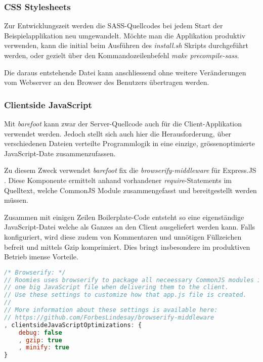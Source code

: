 \subsubsection*{CSS Stylesheets}
Zur Entwicklungszeit werden die SASS-Quellcodes bei jedem Start der Beispielapplikation neu umgewandelt. Möchte man die Applikation produktiv verwenden, kann die initial beim Ausführen des \emph{install.sh} Skripts durchgeführt werden, oder gezielt über den Kommandozeilenbefehl \emph{make precompile-sass}.

Die daraus entstehende Datei kann anschliessend ohne weitere Veränderungen vom Webserver an den Browser des Benutzers übertragen werden.

\subsubsection*{Clientside JavaScript}
Mit \emph{barefoot} \cite{Barefoot} kann zwar der Server-Quellcode auch für die Client-Applikation verwendet werden. Jedoch stellt sich auch hier die Herausforderung, über verschiedenen Dateien verteilte Programmlogik in eine einzige, grössenoptimierte JavaScript-Date zusammenzufassen.

Zu diesem Zweck verwendet \emph{barefoot} fix die \emph{browserify-middleware} für Express.JS \cite{browserifymiddleware}. Diese Komponente ermittelt anhand vorhandener \emph{require}-Statements im Quelltext, welche CommonJS Module \cite{commonjsmodules} zusammengefasst und bereitgestellt werden müssen.

Zusammen mit einigen Zeilen \gls{Boilerplate}-Code entsteht so eine eigenständige JavaScript-Datei welche als Ganzes an den Client ausgeliefert werden kann. Falls konfiguriert, wird diese zudem von Kommentaren und unnötigen Füllzeichen befreit und mittels Gzip \cite{gzip} komprimiert. Dies bringt insbesondere im produktiven Betrieb imense Vorteile.

\begin{lstlisting}[language=JavaScript, firstnumber=95, caption=Konfiguration der browserify Middleware \cite{RoomiesExampleConfig}, label=lst:configBrowserifyMiddleware]
/* Browserify: */
// Roomies uses browserify to package all neceessary CommonJS modules into
// one big JavaScript file when delivering them to the client.
// Use these settings to customize how that app.js file is created.
//
// More information about these settings is available here:
// https://github.com/ForbesLindesay/browserify-middleware
, clientsideJavaScriptOptimizations: {
	debug: false
	, gzip: true
	, minify: true
}
\end{lstlisting}


